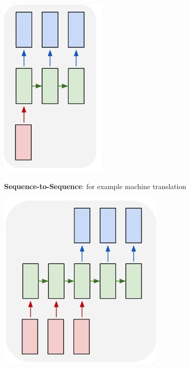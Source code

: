 \documentclass[10pt]{report}
\begin{document}
\begin{multicols}{2}
\begin{list}{}{}
\begin{center}
		\includegraphics[scale=0.5]{88.png}
	\end{center}
	\item \textbf{Sequence-to-Sequence}: for example machine translation
	\begin{center}
		\includegraphics[scale=0.5]{89.png}
	\end{center}
\end{list}
\end{multicols}
\pagebreak
\end{document}
